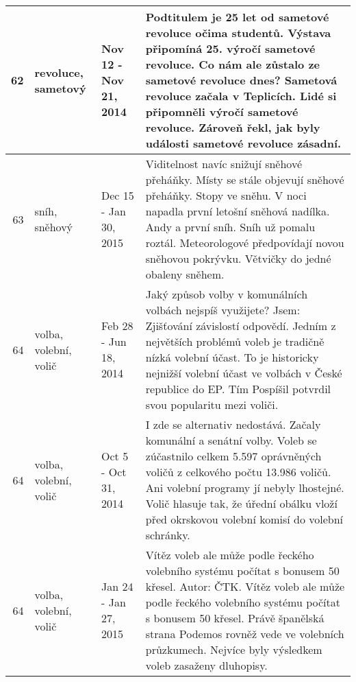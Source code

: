 \begin{tabularx}{\linewidth}{r m{2.5cm} X m{8cm}}
62 & revoluce, sametový & Nov 12 - Nov 21, 2014 & Podtitulem je 25 let od sametové revoluce očima studentů. Výstava připomíná 25. výročí sametové revoluce. Co nám ale zůstalo ze sametové revoluce dnes? Sametová revoluce začala v Teplicích. Lidé si připomněli výročí sametové revoluce. Zároveň řekl, jak byly události sametové revoluce zásadní. \\ \midrule
63 & sníh, sněhový & Dec 15 - Jan 30, 2015 & Viditelnost navíc snižují sněhové přeháňky. Místy se stále objevují sněhové přeháňky. Stopy ve sněhu. V noci napadla první letošní sněhová nadílka. Andy a první sníh. Sníh už pomalu roztál. Meteorologové předpovídají novou sněhovou pokrývku. Větvičky do jedné obaleny sněhem. \\ \midrule
64 & volba, volební, volič & Feb 28 - Jun 18, 2014 & Jaký způsob volby v komunálních volbách nejspíš využijete? Jsem: Zjišťování závislostí odpovědí. Jedním z největších problémů voleb je tradičně nízká volební účast. To je historicky nejnižší volební účast ve volbách v České republice do EP. Tím Pospíšil potvrdil svou popularitu mezi voliči. \\ \midrule
64 & volba, volební, volič & Oct 5 - Oct 31, 2014 & I zde se alternativ nedostává. Začaly komunální a senátní volby. Voleb se zúčastnilo celkem 5.597 oprávněných voličů z celkového počtu 13.986 voličů. Ani volební programy jí nebyly lhostejné. Volič hlasuje tak, že úřední obálku vloží před okrskovou volební komisí do volební schránky. \\ \midrule
64 & volba, volební, volič & Jan 24 - Jan 27, 2015 & Vítěz voleb ale může podle řeckého volebního systému počítat s bonusem 50 křesel. Autor: ČTK. Vítěz voleb ale může podle řeckého volebního systému počítat s bonusem 50 křesel. Právě španělská strana Podemos rovněž vede ve volebních průzkumech. Nejvíce byly výsledkem voleb zasaženy dluhopisy. \\


\bottomrule[1.25pt]
\end{tabularx}